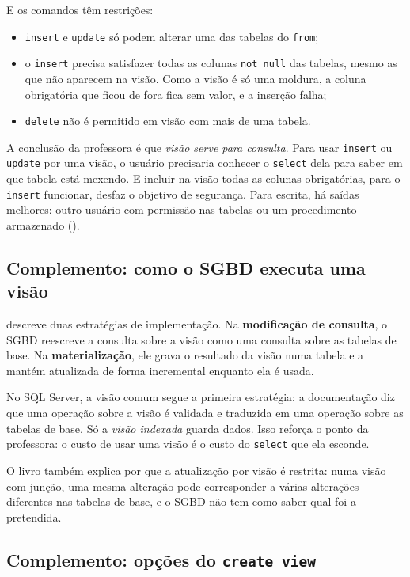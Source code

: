 E os comandos têm restrições:

\begin{itemize}
	\item \texttt{insert} e \texttt{update} só podem alterar uma das
	tabelas do \texttt{from};
	\item o \texttt{insert} precisa satisfazer todas as colunas
	\texttt{not null} das tabelas, mesmo as que não aparecem na visão.
	Como a visão é só uma moldura, a coluna obrigatória que ficou de fora
	fica sem valor, e a inserção falha;
	\item \texttt{delete} não é permitido em visão com mais de uma tabela.
\end{itemize}

A conclusão da professora é que \emph{visão serve para consulta}. Para
usar \texttt{insert} ou \texttt{update} por uma visão, o usuário
precisaria conhecer o \texttt{select} dela para saber em que tabela está
mexendo. E incluir na visão todas as colunas obrigatórias, para o
\texttt{insert} funcionar, desfaz o objetivo de segurança. Para escrita,
há saídas melhores: outro usuário com permissão nas tabelas ou um
procedimento armazenado ().

\subsection*{Complemento: como o SGBD executa uma visão}

\textcite[seção 5.3.3]{Elmasri2011} descreve duas estratégias de
implementação. Na \textbf{modificação de consulta}, o SGBD reescreve a
consulta sobre a visão como uma consulta sobre as tabelas de base. Na
\textbf{materialização}, ele grava o resultado da visão numa tabela e a
mantém atualizada de forma incremental enquanto ela é usada.

No SQL Server, a visão comum segue a primeira estratégia: a
documentação diz que uma operação sobre a visão é
validada e traduzida em uma operação sobre as tabelas de base. Só a
\emph{visão indexada} guarda dados. Isso reforça o ponto da professora:
o custo de usar uma visão é o custo do \texttt{select} que ela esconde.

O livro também explica por que a atualização por visão é restrita: numa
visão com junção, uma mesma alteração pode corresponder a várias
alterações diferentes nas tabelas de base, e o SGBD não tem como saber
qual foi a pretendida.

\subsection*{Complemento: opções do \texttt{create view}}

